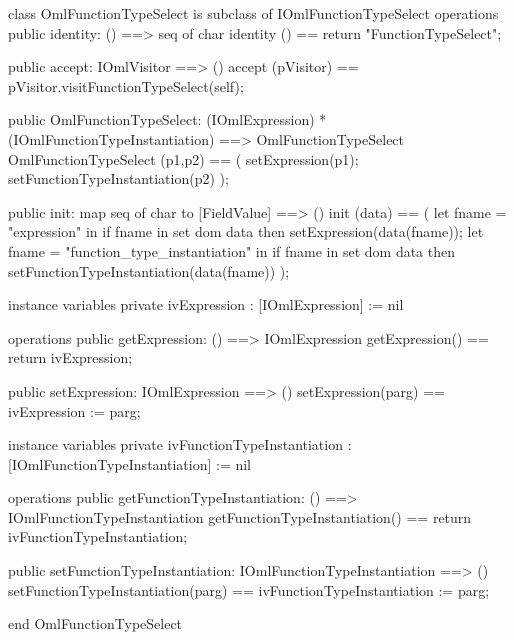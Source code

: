 \begin{vdm_al}
class OmlFunctionTypeSelect is subclass of IOmlFunctionTypeSelect
operations
  public identity: () ==> seq of char
  identity () == return "FunctionTypeSelect";

  public accept: IOmlVisitor ==> ()
  accept (pVisitor) == pVisitor.visitFunctionTypeSelect(self);

  public OmlFunctionTypeSelect:
      (IOmlExpression) *
      (IOmlFunctionTypeInstantiation) ==> OmlFunctionTypeSelect
  OmlFunctionTypeSelect (p1,p2) == 
   ( setExpression(p1);
     setFunctionTypeInstantiation(p2) );

  public init: map seq of char to [FieldValue] ==> ()
  init (data) ==
    ( let fname = "expression" in
        if fname in set dom data
        then setExpression(data(fname));
      let fname = "function_type_instantiation" in
        if fname in set dom data
        then setFunctionTypeInstantiation(data(fname)) );

instance variables
  private ivExpression : [IOmlExpression] := nil

operations
  public getExpression: () ==> IOmlExpression
  getExpression() == return ivExpression;

  public setExpression: IOmlExpression ==> ()
  setExpression(parg) == ivExpression := parg;

instance variables
  private ivFunctionTypeInstantiation : [IOmlFunctionTypeInstantiation] := nil

operations
  public getFunctionTypeInstantiation: () ==> IOmlFunctionTypeInstantiation
  getFunctionTypeInstantiation() == return ivFunctionTypeInstantiation;

  public setFunctionTypeInstantiation: IOmlFunctionTypeInstantiation ==> ()
  setFunctionTypeInstantiation(parg) == ivFunctionTypeInstantiation := parg;

end OmlFunctionTypeSelect
\end{vdm_al}

